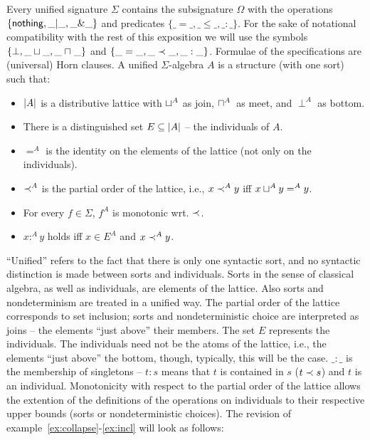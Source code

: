 {Every unified signature $\Sigma$ contains the subsignature $\Omega$ with the operations 
$\{{\sf nothing}, \_|\_, \_\&\_\}$ and 
predicates $\{\_=\_, \_\leq\_, \_:\_\}$. 
For the sake of notational compatibility with the rest of this exposition we will 
use the symbols $\{\perp, \_\sqcup\_, \_\mathrel{\sqcap}\_\}$ and $\{ \_=\_, 
\_\mathrel{\prec}\_, \_:\_\}$. 
Formulae of the specifications are (universal) Horn 
clauses. A unified $\Sigma$-algebra $A$ is a structure (with one sort) such that:
\begin{itemize}\MyLPar
\item	$|A|$ is a distributive lattice with $\sqcup^{A}$ as join, 
$\mathrel{\sqcap}^{A}$\ as meet, and $\perp^{A}$ as bottom.
\item	There is a distinguished set $E\subseteq|A|$ -- the individuals 
of $A$.
\item	$=^{A}$ is the identity on the elements of the lattice (not only on the individuals).
\item	$\mathrel{\prec}^{A}$ is the partial order of the lattice, i.e., 
$x\mathrel{\prec}^{A}y$ iff $x\sqcup^{A} y =^{A} y$.
\item	For every $f\in\Sigma$, $f^{A}$ is monotonic wrt. $\mathrel{\prec}$.
\item	$x :^{A} y$ holds iff $x\in E^{A}$ and $x\mathrel{\prec}^{A}y$.
\end{itemize}
``Unified'' refers to the fact that there is only one syntactic sort, and no syntactic distinction is made 
between sorts and individuals. Sorts in the sense of classical algebra, as well as individuals, are elements of 
the lattice. Also sorts and nondeterminism are treated in a unified way. The partial order of the lattice 
corresponds to set inclusion; sorts and nondeterministic choice are 
interpreted as joins -- the elements 
``just above'' their members. The set $E$ represents the individuals. The individuals need not be the atoms of 
the lattice, i.e., the elements ``just above'' the bottom, though, typically, 
this will be the case. $\_:\_$ is the 
membership of singletons -- $t:s$ means that $t$ is contained in 
$s$ ($t\mathrel{\prec} s$) and $t$ is an individual. Monotonicity 
with respect to the partial order of the lattice allows the extention of the definitions of the operations on 
individuals to their respective upper bounds (sorts or nondeterministic choices).
The revision of example~\ref{ex:collapse}-\ref{ex:incl} will look as follows:

}
